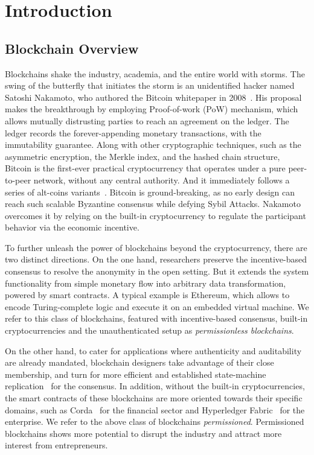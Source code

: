 
\chapter{Introduction}
\label{ch:intro}
\section{Blockchain Overview}
Blockchains shake the industry, academia, and the entire world with storms. 
The swing of the butterfly that initiates the storm is an unidentified hacker named Satoshi Nakamoto, who authored the Bitcoin whitepaper in 2008~\cite{nakamoto2019bitcoin}. 
His proposal makes the breakthrough by employing Proof-of-work (PoW) mechanism, which allows mutually distrusting parties to reach an agreement on the ledger.
The ledger records the forever-appending monetary transactions, with the immutability guarantee. 
Along with other cryptographic techniques, such as the asymmetric encryption, the Merkle index, and the hashed chain structure, Bitcoin is the first-ever practical cryptocurrency that operates under a pure peer-to-peer network, without any central authority. And it immediately follows a series of alt-coins variants~\cite{wiki:List_of_cryptocurrencies}. 
Bitcoin is ground-breaking, as no early design can reach such scalable Byzantine consensus while defying Sybil Attacks. 
Nakamoto overcomes it by relying on the built-in cryptocurrency to regulate the participant behavior via the economic incentive. 

To further unleash the power of blockchains beyond the cryptocurrency, there are two distinct directions. 
On the one hand, researchers preserve the incentive-based consensus to resolve the anonymity in the open setting. 
But it extends the system functionality from simple monetary flow into arbitrary data transformation, powered by smart contracts. 
A typical example is Ethereum, which allows to encode Turing-complete logic and execute it on an embedded virtual machine. 
We refer to this class of blockchains, featured with incentive-based consensus, built-in cryptocurrencies and the unauthenticated setup as \textit{permissionless blockchains}. 

On the other hand, to cater for applications where authenticity and auditability are already mandated, blockchain designers take advantage of their close membership, and turn for more efficient and established state-machine replication~\cite{schneider1990implementing} for the consensus. 
In addition, without the built-in cryptocurrencies, the smart contracts of these blockchains are more oriented towards their specific domains, such as Corda~\cite{hearn2016corda} for the financial sector and Hyperledger Fabric~\cite{androulaki2018hyperledger} for the enterprise. 
We refer to the above class of blockchains \textit{permissioned}.
Permissioned blockchains shows more potential to disrupt the industry and attract more interest from entrepreneurs. 


